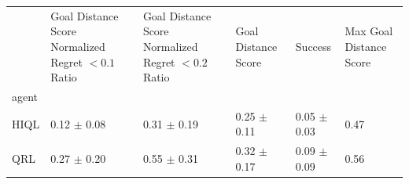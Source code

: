 \begin{tabular}{llllll}
\toprule
 & Goal Distance Score Normalized Regret $< 0.1$ Ratio & Goal Distance Score Normalized Regret $< 0.2$ Ratio & Goal Distance Score & Success & Max Goal Distance Score \\
agent &  &  &  &  &  \\
\midrule
HIQL & 0.12 $\pm$ 0.08 & 0.31 $\pm$ 0.19 & 0.25 $\pm$ 0.11 & 0.05 $\pm$ 0.03 & 0.47 \\
QRL & 0.27 $\pm$ 0.20 & 0.55 $\pm$ 0.31 & 0.32 $\pm$ 0.17 & 0.09 $\pm$ 0.09 & 0.56 \\
\bottomrule
\end{tabular}
